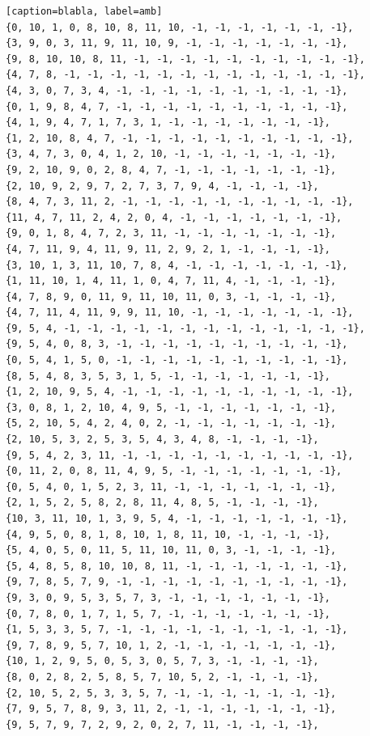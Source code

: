 \documentclass[12pt]{article}
\begin{document}
\begin{lstlisting}[frame=single, basicstyle=\scriptsize][caption=blabla, label=amb]
{0, 10, 1, 0, 8, 10, 8, 11, 10, -1, -1, -1, -1, -1, -1, -1},
{3, 9, 0, 3, 11, 9, 11, 10, 9, -1, -1, -1, -1, -1, -1, -1},
{9, 8, 10, 10, 8, 11, -1, -1, -1, -1, -1, -1, -1, -1, -1, -1},
{4, 7, 8, -1, -1, -1, -1, -1, -1, -1, -1, -1, -1, -1, -1, -1},
{4, 3, 0, 7, 3, 4, -1, -1, -1, -1, -1, -1, -1, -1, -1, -1},
{0, 1, 9, 8, 4, 7, -1, -1, -1, -1, -1, -1, -1, -1, -1, -1},
{4, 1, 9, 4, 7, 1, 7, 3, 1, -1, -1, -1, -1, -1, -1, -1},
{1, 2, 10, 8, 4, 7, -1, -1, -1, -1, -1, -1, -1, -1, -1, -1},
{3, 4, 7, 3, 0, 4, 1, 2, 10, -1, -1, -1, -1, -1, -1, -1},
{9, 2, 10, 9, 0, 2, 8, 4, 7, -1, -1, -1, -1, -1, -1, -1},
{2, 10, 9, 2, 9, 7, 2, 7, 3, 7, 9, 4, -1, -1, -1, -1},
{8, 4, 7, 3, 11, 2, -1, -1, -1, -1, -1, -1, -1, -1, -1, -1},
{11, 4, 7, 11, 2, 4, 2, 0, 4, -1, -1, -1, -1, -1, -1, -1},
{9, 0, 1, 8, 4, 7, 2, 3, 11, -1, -1, -1, -1, -1, -1, -1},
{4, 7, 11, 9, 4, 11, 9, 11, 2, 9, 2, 1, -1, -1, -1, -1},
{3, 10, 1, 3, 11, 10, 7, 8, 4, -1, -1, -1, -1, -1, -1, -1},
{1, 11, 10, 1, 4, 11, 1, 0, 4, 7, 11, 4, -1, -1, -1, -1},
{4, 7, 8, 9, 0, 11, 9, 11, 10, 11, 0, 3, -1, -1, -1, -1},
{4, 7, 11, 4, 11, 9, 9, 11, 10, -1, -1, -1, -1, -1, -1, -1},
{9, 5, 4, -1, -1, -1, -1, -1, -1, -1, -1, -1, -1, -1, -1, -1},
{9, 5, 4, 0, 8, 3, -1, -1, -1, -1, -1, -1, -1, -1, -1, -1},
{0, 5, 4, 1, 5, 0, -1, -1, -1, -1, -1, -1, -1, -1, -1, -1},
{8, 5, 4, 8, 3, 5, 3, 1, 5, -1, -1, -1, -1, -1, -1, -1},
{1, 2, 10, 9, 5, 4, -1, -1, -1, -1, -1, -1, -1, -1, -1, -1},
{3, 0, 8, 1, 2, 10, 4, 9, 5, -1, -1, -1, -1, -1, -1, -1},
{5, 2, 10, 5, 4, 2, 4, 0, 2, -1, -1, -1, -1, -1, -1, -1},
{2, 10, 5, 3, 2, 5, 3, 5, 4, 3, 4, 8, -1, -1, -1, -1},
{9, 5, 4, 2, 3, 11, -1, -1, -1, -1, -1, -1, -1, -1, -1, -1},
{0, 11, 2, 0, 8, 11, 4, 9, 5, -1, -1, -1, -1, -1, -1, -1},
{0, 5, 4, 0, 1, 5, 2, 3, 11, -1, -1, -1, -1, -1, -1, -1},
{2, 1, 5, 2, 5, 8, 2, 8, 11, 4, 8, 5, -1, -1, -1, -1},
{10, 3, 11, 10, 1, 3, 9, 5, 4, -1, -1, -1, -1, -1, -1, -1},
{4, 9, 5, 0, 8, 1, 8, 10, 1, 8, 11, 10, -1, -1, -1, -1},
{5, 4, 0, 5, 0, 11, 5, 11, 10, 11, 0, 3, -1, -1, -1, -1},
{5, 4, 8, 5, 8, 10, 10, 8, 11, -1, -1, -1, -1, -1, -1, -1},
{9, 7, 8, 5, 7, 9, -1, -1, -1, -1, -1, -1, -1, -1, -1, -1},
{9, 3, 0, 9, 5, 3, 5, 7, 3, -1, -1, -1, -1, -1, -1, -1},
{0, 7, 8, 0, 1, 7, 1, 5, 7, -1, -1, -1, -1, -1, -1, -1},
{1, 5, 3, 3, 5, 7, -1, -1, -1, -1, -1, -1, -1, -1, -1, -1},
{9, 7, 8, 9, 5, 7, 10, 1, 2, -1, -1, -1, -1, -1, -1, -1},
{10, 1, 2, 9, 5, 0, 5, 3, 0, 5, 7, 3, -1, -1, -1, -1},
{8, 0, 2, 8, 2, 5, 8, 5, 7, 10, 5, 2, -1, -1, -1, -1},
{2, 10, 5, 2, 5, 3, 3, 5, 7, -1, -1, -1, -1, -1, -1, -1},
{7, 9, 5, 7, 8, 9, 3, 11, 2, -1, -1, -1, -1, -1, -1, -1},
{9, 5, 7, 9, 7, 2, 9, 2, 0, 2, 7, 11, -1, -1, -1, -1},

\end{lstlisting}
\end{document}
